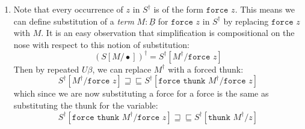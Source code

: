 \documentclass[acmsmall,nonacm]{acmart}
\renewcommand{\u}{\underline}
\newcommand{\ltdyn}{\sqsubseteq}
\newcommand{\gtdyn}{\sqsupseteq}
\newcommand{\equidyn}{\mathrel{\gtdyn\ltdyn}}
\newcommand{\simp}[1]{{#1}^{\dag}}
\newcommand{\simpp}[1]{\simp{({#1})}}
\newcommand{\bindXtoYinZ}[2]{\kw{bind}#2 \leftarrow #1;}
\newcommand{\kw}[1]{\texttt{#1}\,\,}
\newcommand{\ret}{\kw{ret}}
\newcommand{\thunk}{\kw{thunk}}
\newcommand{\force}{\kw{force}}
\begin{document}
{\begin{longonly}
\begin{longproof}
\begin{enumerate}
  Then we can lift the definition of the thunk to the top-level by $\u F\beta$:
  \[ \simp{E}[\force\thunk\simp V/\ret x] \equidyn
  \bindXtoYinZ \ret\thunk \simp V w \simp{E}[\force w/\ret x]
  \]
  Then because $\simp V$ is thunkable, we can bind it at the top-level
  and reduce an administrative redex away to get our desired result:
  \begin{align*}
    &\bindXtoYinZ \ret\thunk \simp V w \simp{E}[\force w/\ret x]\\
    &\equidyn \bindXtoYinZ {\simp V} x \bindXtoYinZ {\ret\thunk\ret x} w \simp{E}[\force w/\ret x]\tag{$V$ thunkable}\\
    &\equidyn \bindXtoYinZ {\simp V} x \simp{E}[\force \thunk\ret x/\ret x]\tag{$\u F\beta$}\\
    &\equidyn \bindXtoYinZ {\simp V} x \simp{E}[\ret x/\ret x]\tag{$U\beta$}\\
    &\equidyn \bindXtoYinZ {\simp V} x \simp{E}\\
  \end{align*}
  \item Note that every occurrence of $z$ in $\simp S$ is of the form
    $\force z$. This means we can define substitution of a \emph{term}
    $M : \u B$ for $\force z$ in $\simp S$ by replacing $\force z$
    with $M$.  It is an easy observation that simplification is
    compositional on the nose with respect to this notion of
    substitution:
    \[ \simpp{S[M/\bullet]} = \simp S[\simp M/\force z] \]
    Then by repeated $U\beta$, we can replace $\simp M$ with a forced thunk:
    \[ \simp S[\simp M/\force z] \equidyn \simp S[\force\thunk \simp M/\force z] \]
    which since we are now substituting a force for a force is the
    same as substituting the thunk for the variable:
    \[ \simp S[\force\thunk \simp M/\force z]
    \equidyn
    \simp S[\thunk \simp M / z]
    \]
  \end{enumerate}
\end{longproof}


\end{longonly}}
\end{document}
